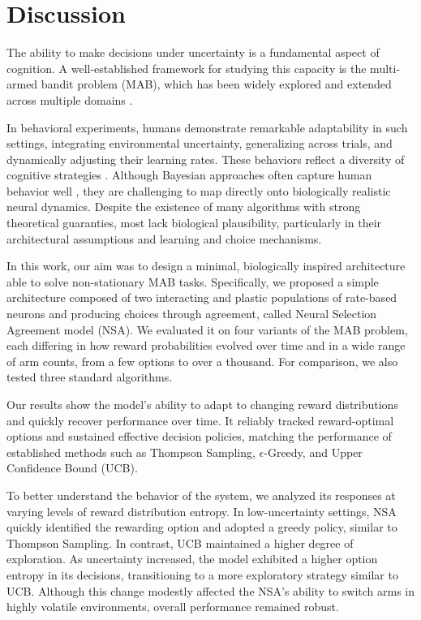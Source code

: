 \section{Discussion}

The ability to make decisions under uncertainty is a fundamental aspect of cognition. A well-established framework for studying this capacity is the multi-armed bandit problem (MAB), which has been widely explored and extended across multiple domains \cite{suttonReinforcementLearningProblem1998, liuComprehensiveExplorationImplementation2024}.

In behavioral experiments, humans demonstrate remarkable adaptability in such settings, integrating environmental uncertainty, generalizing across trials, and dynamically adjusting their learning rates. These behaviors reflect a diversity of cognitive strategies \cite{steyversBayesianAnalysisHuman2009}. Although Bayesian approaches often capture human behavior well \cite{behrensLearningValueInformation2007, schulzFindingStructureMultiarmed2020, zhangForgetfulBayesMyopic2013}, they are challenging to map directly onto biologically realistic neural dynamics. Despite the existence of many algorithms with strong theoretical guaranties, most lack biological plausibility, particularly in their architectural assumptions and learning and choice mechanisms.

In this work, our aim was to design a minimal, biologically inspired architecture able to solve non-stationary MAB tasks.
Specifically, we proposed a simple architecture composed of two interacting and plastic populations of rate-based neurons and producing choices through agreement, called Neural Selection Agreement model (NSA).
We evaluated it on four variants of the MAB problem, each differing in how reward probabilities evolved over time and in a wide range of arm counts, from a few options to over a thousand. For comparison, we also tested three standard algorithms.

Our results show the model's ability to adapt to changing reward distributions and quickly recover performance over time.
It reliably tracked reward-optimal options and sustained effective decision policies, matching the performance of established methods such as Thompson Sampling, $\epsilon$-Greedy, and Upper Confidence Bound (UCB).

To better understand the behavior of the system, we analyzed its responses at varying levels of reward distribution entropy.
In low-uncertainty settings, NSA quickly identified the rewarding option and adopted a greedy policy, similar to Thompson Sampling.
In contrast, UCB maintained a higher degree of exploration. As uncertainty increased, the model exhibited a higher option entropy in its decisions, transitioning to a more exploratory strategy similar to UCB.
Although this change modestly affected the NSA's ability to switch arms in highly volatile environments, overall performance remained robust.

